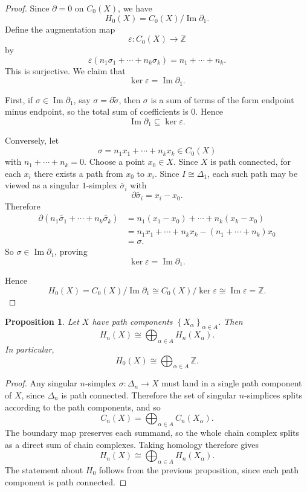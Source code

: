 \documentclass[11pt,a4paper]{article}
\theoremstyle{definition}
\theoremstyle{plain}
\newtheorem{proposition}[definition]{Proposition}
\theoremstyle{remark}
\renewcommand{\set}[1]{\left\{ #1 \right\}}
\newcommand{\1}{\mathbbm{1}}
\begin{document}
\begin{proof}
    Since $\partial=0$ on $C_0(X)$, we have
    \[
    H_0(X) = C_0(X)/\operatorname{Im}\partial_1.
    \]
    Define the augmentation map
    \[
    \varepsilon \colon C_0(X)\to \mathbb{Z}
    \]
    by
    \[
    \varepsilon(n_1\sigma_1+\cdots+n_k\sigma_k)=n_1+\cdots+n_k.
    \]
    This is surjective. We claim that
    \[
    \ker \varepsilon = \operatorname{Im}\partial_1.
    \]

    First, if $\sigma \in \operatorname{Im}\partial_1$, say $\sigma=\partial \tilde{\sigma}$, then $\sigma$ is a sum of terms
    of the form endpoint minus endpoint, so the total sum of coefficients is $0$. Hence
    \[
    \operatorname{Im}\partial_1 \subseteq \ker \varepsilon.
    \]

    Conversely, let
    \[
    \sigma = n_1x_1+\cdots+n_kx_k \in C_0(X)
    \]
    with $n_1+\cdots+n_k=0$. Choose a point $x_0\in X$. Since $X$ is path connected, for each $x_i$ there exists a path
    from $x_0$ to $x_i$. Since $I\cong \Delta_1$, each such path may be viewed as a singular $1$-simplex $\tilde{\sigma_i}$ with
    \[
    \partial \tilde{\sigma_i} = x_i - x_0.
    \]
    Therefore
    \begin{align*}
        \partial(n_1\tilde{\sigma_1}+\cdots+n_k\tilde{\sigma_k})
        &= n_1(x_1-x_0)+\cdots+n_k(x_k-x_0) \\
        &= n_1x_1+\cdots+n_kx_k - (n_1+\cdots+n_k)x_0 \\
        &= \sigma.
    \end{align*}
    So $\sigma \in \operatorname{Im}\partial_1$, proving
    \[
    \ker \varepsilon = \operatorname{Im}\partial_1.
    \]

    Hence
    \[
    H_0(X)=C_0(X)/\operatorname{Im}\partial_1 \cong C_0(X)/\ker\varepsilon \cong \operatorname{Im}\varepsilon = \mathbb{Z}.
    \]
\end{proof}

\begin{proposition}
    Let $X$ have path components $\set{X_\alpha}_{\alpha\in A}$. Then
    \[
    H_n(X) \cong \bigoplus_{\alpha\in A} H_n(X_\alpha).
    \]
    In particular,
    \[
    H_0(X) \cong \bigoplus_{\alpha\in A} \mathbb{Z}.
    \]
\end{proposition}

\begin{proof}
    Any singular $n$-simplex $\sigma \colon \Delta_n \to X$ must land in a single path component of $X$, since $\Delta_n$
    is path connected. Therefore the set of singular $n$-simplices splits according to the path components, and so
    \[
    C_n(X)=\bigoplus_{\alpha\in A} C_n(X_\alpha).
    \]
    The boundary map preserves each summand, so the whole chain complex splits as a direct sum of chain complexes.
    Taking homology therefore gives
    \[
    H_n(X)\cong \bigoplus_{\alpha\in A} H_n(X_\alpha).
    \]
    The statement about $H_0$ follows from the previous proposition, since each path component is path connected.
\end{proof}
\end{document}
